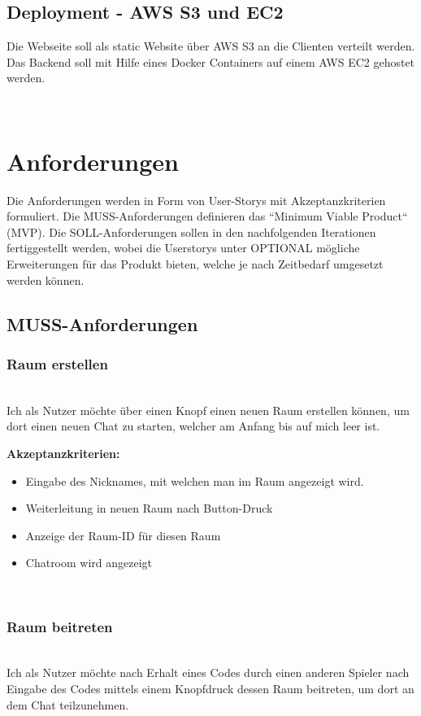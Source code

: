 \documentclass[conference]{IEEEtran}
\begin{document}
	\subsection{Deployment - AWS S3 und EC2}
	Die Webseite soll als static Website über AWS S3 an die Clienten verteilt werden. Das Backend soll mit Hilfe eines Docker Containers auf einem AWS EC2 gehostet werden.

	\ \\
	\section{Anforderungen}
	Die Anforderungen werden in Form von User-Storys mit Akzeptanzkriterien formuliert. Die MUSS-Anforderungen definieren das ``Minimum Viable Product`` (MVP). Die SOLL-Anforderungen sollen in den nachfolgenden Iterationen fertiggestellt werden, wobei die Userstorys unter OPTIONAL mögliche Erweiterungen für das Produkt bieten, welche je nach Zeitbedarf umgesetzt werden können.
	\subsection{MUSS-Anforderungen}

	\subsubsection{Raum erstellen}
	\ \\
	Ich als Nutzer möchte über einen Knopf einen neuen Raum erstellen können, um dort einen neuen Chat zu starten, welcher am Anfang bis auf mich leer ist.
	
	\textbf{Akzeptanzkriterien:}
	\begin{itemize}
		\item Eingabe des Nicknames, mit welchen man im Raum angezeigt wird.
		\item Weiterleitung in neuen Raum nach Button-Druck
		\item Anzeige der Raum-ID für diesen Raum
		\item Chatroom wird angezeigt
	\end{itemize}
	\ \\
	\subsubsection{Raum beitreten}
	\ \\
	Ich als Nutzer möchte nach Erhalt eines Codes durch einen anderen Spieler nach Eingabe des Codes mittels einem Knopfdruck dessen Raum beitreten, um dort an dem Chat teilzunehmen.
	
\end{document}
